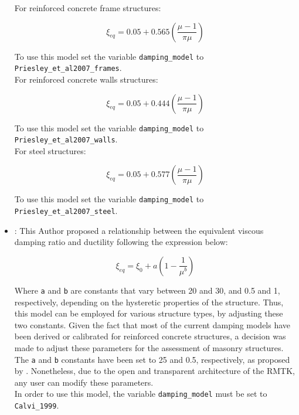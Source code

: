 \begin{itemize}
For reinforced concrete frame structures:

\begin{equation}
	\xi_{eq} = 0.05 + 0.565\left(\frac{\mu-1}{\pi\mu}\right)
\end{equation}

To use this model set the variable \verb=damping_model= to \verb=Priesley_et_al2007_frames=.\\

For reinforced concrete walls structures:

\begin{equation}
\xi_{eq} = 0.05 + 0.444\left(\frac{\mu-1}{\pi\mu}\right)
\end{equation}

To use this model set the variable \verb=damping_model= to \verb=Priesley_et_al2007_walls=.\\

For steel structures:

\begin{equation}
	\xi_{eq} = 0.05 + 0.577\left(\frac{\mu-1}{\pi\mu}\right)
\end{equation}

To use this model set the variable \verb=damping_model= to \verb=Priesley_et_al2007_steel=.\\

\item \cite{Calvi1999}: This Author proposed a relationship between the equivalent viscous damping ratio and ductility following the expression below:

\begin{equation}
	\xi_{eq} = \xi_0 + a\left(1-\frac{1}{\mu^b}\right)
\end{equation}

Where \verb=a= and \verb=b= are constants that vary between 20 and 30, and 0.5 and 1, respectively, depending on the hysteretic properties of the structure. Thus, this model can be employed for various structure types, by adjusting these two constants. Given the fact that most of the current damping models have been derived or calibrated for reinforced concrete structures, a decision was made to adjust these parameters for the assessment of masonry structures. The \verb=a= and \verb=b= constants have been set to 25 and 0.5, respectively, as proposed by \cite{BorziEtAl2008a}. Nonetheless, due to the open and transparent architecture of the RMTK, any user can modify these parameters.\\

In order to use this model, the variable \verb=damping_model= must be set to \verb=Calvi_1999=.\\

\end{itemize}
